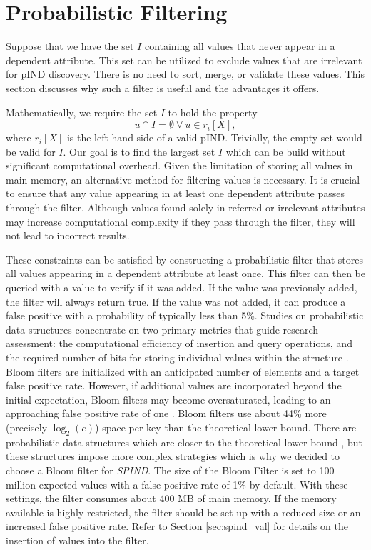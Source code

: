 \section{Probabilistic Filtering}\label{subsec:prob_filter}

Suppose that we have the set $I$ containing all values that never appear in a dependent attribute. This set can be utilized to exclude values that are irrelevant for pIND discovery. There is no need to sort, merge, or validate these values. This section discusses why such a filter is useful and the advantages it offers.

Mathematically, we require the set $I$ to hold the property
$$u \cap I = \emptyset \: \forall \: u \in r_i[X],$$
where $r_i[X]$ is the left-hand side of a valid pIND.
Trivially, the empty set would be valid for $I$. Our goal is to find the largest set $I$ which can be build without significant computational overhead. Given the limitation of storing all values in main memory, an alternative method for filtering values is necessary. It is crucial to ensure that any value appearing in at least one dependent attribute passes through the filter. Although values found solely in referred or irrelevant attributes may increase computational complexity if they pass through the filter, they will not lead to incorrect results.

These constraints can be satisfied by constructing a probabilistic filter that stores all values appearing in a dependent attribute at least once. This filter can then be queried with a value to verify if it was added. If the value was previously added, the filter will always return true. If the value was not added, it can produce a false positive with a probability of typically less than 5\%. Studies on probabilistic data structures concentrate on two primary metrics that guide research assessment: the computational efficiency of insertion and query operations, and the required number of bits for storing individual values within the structure \cite{fan2014cuckoo}. Bloom filters are initialized with an anticipated number of elements and a target false positive rate. However, if additional values are incorporated beyond the initial expectation, Bloom filters may become oversaturated, leading to an approaching false positive rate of one \cite{tarkoma2011theory}. Bloom filters use about 44\% more (precisely $\log_2(e)$) space per key than the theoretical lower bound. There are probabilistic data structures which are closer to the theoretical lower bound \cite{fan2014cuckoo}, but these structures impose more complex strategies which is why we decided to choose a Bloom filter for \textit{SPIND}. The size of the Bloom Filter is set to 100 million expected values with a false positive rate of 1\% by default. With these settings, the filter consumes about 400 MB of main memory. If the memory available is highly restricted, the filter should be set up with a reduced size or an increased false positive rate. Refer to Section \ref{sec:spind_val} for details on the insertion of values into the filter.

